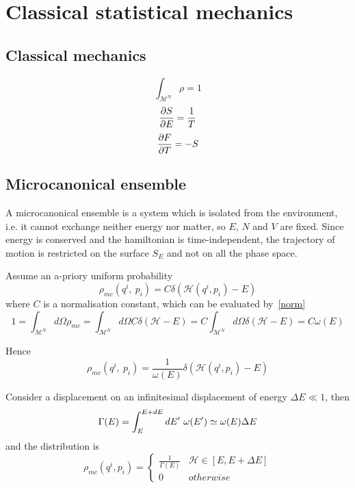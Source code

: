 \part{Classical statistical mechanics}

\chapter{Classical mechanics}

    \begin{equation}\label{norm}
        \int_{\mathcal M^N} \rho = 1
    \end{equation}
    \begin{equation}\label{T}
        \frac{\partial S}{\partial E} = \frac{1}{T}
    \end{equation}
    \begin{equation}\label{F}
        \frac{\partial F}{\partial T} = - S
    \end{equation}

\chapter{Microcanonical ensemble}

    A microcanonical ensemble is a system which is isolated from the environment, i.e. it cannot exchange neither energy nor matter, so $E$, $N$ and $V$ are fixed. Since energy is conserved and the hamiltonian is time-independent, the trajectory of motion is restricted on the surface $S_E$ and not on all the phase space.
    
    Assume an a-priory uniform probability 
    \begin{equation*}
        \rho_{mc}(q^i, ~p_i) = C \delta (\mathcal H(q^i, p_i) - E)
    \end{equation*}
    where $C$ is a normalisation constant, which can be evaluated by~\eqref{norm}
    \begin{equation*}
        1 = \int_{\mathcal M^N} d\Omega \rho_{mc} = \int_{\mathcal M^N} d\Omega C \delta(\mathcal H - E) = C \int_{\mathcal M^N} d\Omega \delta(\mathcal H - E) = C \omega(E)
    \end{equation*}

    Hence
    \begin{equation*}
        \rho_{mc}(q^i, ~p_i) = \frac{1}{\omega(E)} \delta (\mathcal H(q^i, p_i) - E)
    \end{equation*}

    Consider a displacement on an infinitesimal displacement of energy $\Delta E \ll 1$, then 
    \begin{equation*}
        \Gamma (E) = \int_{E}^{E+dE}dE'~ \omega(E') \simeq \omega(E) \Delta E
    \end{equation*}
    and the distribution is 
    \begin{equation*}
        \rho_{mc}(q^i, p_i) = \begin{cases}
            \frac{1}{\Gamma(E)} & \mathcal H \in [E, E + \Delta E] \\
            0 & otherwise
        \end{cases}
    \end{equation*}

